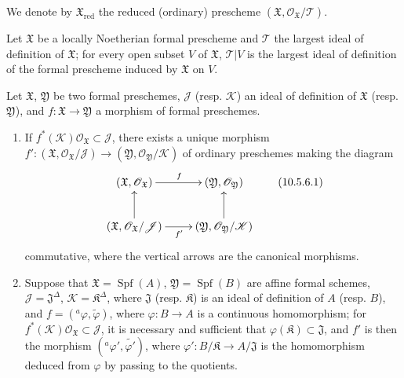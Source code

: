 We denote by $\mathfrak{X}_{\mathrm{red}}$ the reduced (ordinary)
prescheme $(\mathfrak{X},\mathscr{O}_{\mathfrak{X}}/\mathscr{T})$.

\begin{corollary}[10.5.5]
\label{I.10.5.5}
Let $\mathfrak{X}$ be a locally Noetherian formal prescheme and
$\mathscr{T}$ the largest ideal of definition of $\mathfrak{X}$; for
every open subset $V$ of $\mathfrak{X}$, $\mathscr{T}|V$ is the largest
ideal of definition of the formal prescheme induced by $\mathfrak{X}$ on
$V$.
\end{corollary}


\begin{proposition}[10.5.6]
\label{I.10.5.6}
Let $\mathfrak{X}$, $\mathfrak{Y}$ be two formal preschemes,
$\mathscr{J}$ (resp. $\mathscr{K}$) an ideal of definition of
$\mathfrak{X}$ (resp. $\mathfrak{Y}$), and
$f:\mathfrak{X}\to\mathfrak{Y}$ a morphism of formal preschemes.
\begin{enumerate}
  \item[\rm{(i)}] If
    $f^*(\mathscr{K})\mathscr{O}_{\mathfrak{X}}\subset\mathscr{J}$,
    there exists a unique morphism
    $f':(\mathfrak{X},\mathscr{O}_{\mathfrak{X}}/\mathscr{J})\to
    (\mathfrak{Y},\mathscr{O}_{\mathfrak{Y}}/\mathscr{K})$ of
    ordinary preschemes making the diagram
    \[
      \label{I.10.5.6.1}
      \xymatrix{
        (\mathfrak{X},\mathscr{O}_{\mathfrak{X}})\ar[r]^f &
        (\mathfrak{Y},\mathscr{O}_{\mathfrak{Y}})\\
        (\mathfrak{X},\mathscr{O}_{\mathfrak{X}}/\mathscr{J})
          \ar[r]_{f'}\ar[u] &
        (\mathfrak{Y},\mathscr{O}_{\mathfrak{Y}}/\mathscr{K})\ar[u]
      }
      \tag{10.5.6.1}
    \]
    commutative, where the vertical arrows are the canonical morphisms.
  \item[\rm{(ii)}] Suppose that
    $\mathfrak{X}=\operatorname{Spf}(A)$,
    $\mathfrak{Y}=\operatorname{Spf}(B)$ are affine formal
    schemes, $\mathscr{J}=\mathfrak{J}^{\Delta}$,
    $\mathscr{K}=\mathfrak{K}^{\Delta}$, where $\mathfrak{J}$ (resp.
    $\mathfrak{K}$) is an ideal of definition of $A$ (resp. $B$), and
    $f=({}^a\varphi,\widetilde{\varphi})$, where
    $\varphi:B\to A$ is a continuous homomorphism; for
    $f^*(\mathscr{K})\mathscr{O}_{\mathfrak{X}}\subset\mathscr{J}$,
    it is necessary and sufficient that
    $\varphi(\mathfrak{K})\subset\mathfrak{J}$, and $f'$ is then the
    morphism $({}^a\varphi',\widetilde{\varphi'})$, where
    $\varphi':B/\mathfrak{K}\to A/\mathfrak{J}$ is the homomorphism
    deduced from $\varphi$ by passing to the quotients.
\end{enumerate}
\end{proposition}

